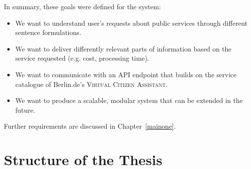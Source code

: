 In summary, these goals were defined for the system:

\begin{itemize}
	\item We want to understand user's requests about public services through different sentence formulations.
	
	\item We want to deliver differently relevant parts of information based on the service requested (e.g. cost, processing time).
	
	\item We want to communicate with an API endpoint that builds on the service catalogue of Berlin.de's \textsc{Virtual Citizen Assistant}.
	
	\item We want to produce a scalable, modular system that can be extended in the future.
\end{itemize}

Further requirements are discussed in Chapter~\ref{mainone}.






















\section{Structure of the Thesis}
%

